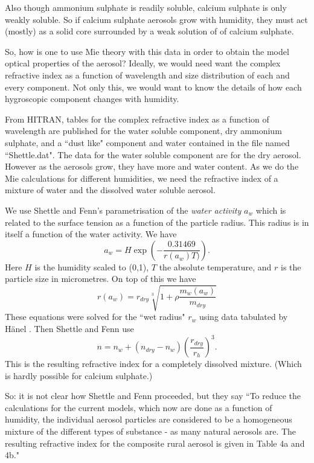 \documentclass[12pt]{article}
\begin{document}
Also though ammonium sulphate is readily soluble, calcium sulphate
is only weakly soluble. So if calcium  sulphate aerosols grow with humidity, they must
act (mostly) as a solid core surrounded by a weak solution of of calcium sulphate.

So, how is one to use Mie theory with this data in order to obtain the model
optical properties of the aerosol? Ideally, we would need want the complex
refractive index as a function of wavelength and size distribution of each and every component.
Not only this, we would want to know the details of how each hygroscopic component
changes with humidity.


From HITRAN,  tables for the complex refractive index as a function of wavelength
are published for the water soluble component, dry ammonium sulphate, and a ``dust like" component
and  water contained in the file named ``Shettle.dat".  The data for
the water soluble component are for the dry aerosol. However as the
aerosols grow, they have more and water content. As we do the Mie
calculations for different humidities, we need the refractive index of a mixture
of  water and the dissolved water soluble aerosol. 


We use Shettle and Fenn's parametrisation of the
{\it water activity} $a_w$ which is related to the surface tension as 
a function
of the particle radius. This radius is in itself a function of the water
 activity. We have
\begin{equation}
a_w=H \exp \left ( -\frac{0.31469}{r(a_w) T)} \right).
\end{equation}
Here $H$ is the humidity scaled to (0,1), $T$ the absolute temperature, and $r$ is the particle
size in micrometres.
On top of this we have
\begin{equation}
r(a_w)= r_{dry}\sqrt[3]{1+\rho \frac{ m_w(a_w)}{m_{dry}}}
\end{equation}
These equations were solved for the ``wet radius" $r_w$ using data tabulated by H\"anel \cite{Hanel:Mybib}. Then Shettle and Fenn
use
\begin{equation}
n=n_w+(n_{dry}-n_w) \left ( \frac{r_{dry}}{r_h} \right )^3.
\end{equation}
This is the resulting refractive index for a completely dissolved mixture. 
(Which is hardly possible for calcium sulphate.)

So: it is not clear how Shettle and Fenn proceeded, but they say ``To reduce the
calculations for the current models, which now are done as a function of
humidity, the individual aerosol particles are considered to be a homogeneous
mixture of the different types of substance - as many natural aerosols are. The
resulting  refractive index for the composite rural aerosol is given
 in Table 4a and 4b." 
\end{document}
